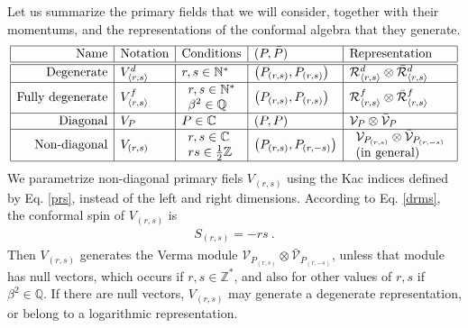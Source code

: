 \documentclass[12pt, a4paper]{article}
\theoremstyle{break}
\begin{document}
Let us summarize the primary fields that we will consider, together with their momentums, and the representations of the conformal algebra that they generate. 
\begin{align}
 \begin{array}{|r|l|l|l|l|}
  \hline 
  \text{Name} & \text{Notation} & \text{Conditions} & (P, \bar P) & \text{Representation}
  \\
  \hline \hline 
  \text{Degenerate} &  V^d_{\langle r,s\rangle} &  r,s\in\mathbb{N}^* & \left(P_{(r,s)},P_{(r,s)}\right)  & \mathcal{R}^d_{\langle r,s\rangle}\otimes \bar{\mathcal{R}}^d_{\langle r,s\rangle} 
  \\
  \hline 
  \text{Fully degenerate} & V^f_{\langle r,s\rangle} & \begin{array}{l} r,s\in\mathbb{N}^* \\ \beta^2\in\mathbb{Q} \end{array} & \left(P_{(r,s)},P_{(r,s)}\right)  & \mathcal{R}^f_{\langle r,s\rangle}\otimes \bar{\mathcal{R}}^f_{\langle r,s\rangle} 
  \\
  \hline 
  \text{Diagonal} & V_P & P\in\mathbb{C} & \left(P,P\right) & \mathcal{V}_P\otimes \bar{\mathcal{V}}_P 
  \\
  \hline 
  \text{Non-diagonal} & V_{(r,s)} & 
  \begin{array}{l} r,s\in\mathbb{C} \\ 
  rs\in \tfrac12\mathbb{Z} \end{array} & \left(P_{(r,s)},P_{(r,-s)}\right) & 
  \begin{array}{l} \mathcal{V}_{P_{(r,s)}} \otimes \bar{\mathcal{V}}_{P_{(r,-s)}} \\ \text{(in general)} \end{array}
  \\
  \hline 
 \end{array}
 \label{fields}
\end{align}
We parametrize non-diagonal primary fiels $V_{(r,s)}$ using the Kac indices defined by Eq. \eqref{prs}, instead of the left and right dimensions. 
According to Eq. \eqref{drms}, the conformal spin of $V_{(r,s)}$ is 
\begin{align}
 \boxed{S_{(r,s)}= -rs} \ . 
 \label{srs}
\end{align}
Then $V_{(r,s)}$ generates the Verma module $\mathcal{V}_{P_{(r,s)}} \otimes \bar{\mathcal{V}}_{P_{(r,-s)}}$, unless that module has null vectors, which occurs if $r,s\in\mathbb{Z}^*$, and also for other values of $r,s$ if $\beta^2\in\mathbb{Q}$. If there are null vectors, $V_{(r,s)}$ may generate a degenerate representation, or belong to a logarithmic representation. 
\end{document}
